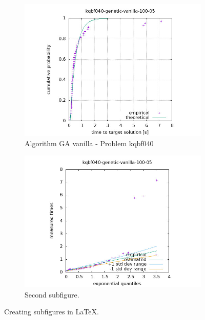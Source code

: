 \begin{figure}[H]
    \centering
    \begin{subfigure}{0.49\textwidth}
        \includegraphics[width=\textwidth]{figure/ttt_plot/kqbf040-genetic-vanilla-100-05-exp.jpeg}
        \caption{Algorithm GA vanilla - Problem kqbf040}
        \label{fig:ga-vanilla-kqbf040-exp}
    \end{subfigure}
    \hfill
    \begin{subfigure}{0.49\textwidth}
        \includegraphics[width=\textwidth]{figure/ttt_plot/kqbf040-genetic-vanilla-100-05-qq.jpeg}
        \caption{Second subfigure.}
        \label{fig:ga-vanilla-kqbf040-qq}
    \end{subfigure}
    \caption{Creating subfigures in \LaTeX.}
    \label{fig:ga-vanilla-kqbf040}
\end{figure}


